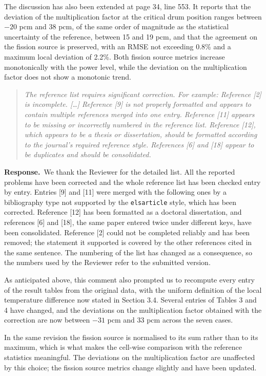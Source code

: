 \documentclass[11pt]{article}
\newenvironment{reviewer}%
  {\medskip\begin{quote}\itshape\color{black!70}}%
  {\end{quote}}
\newcommand{\answer}{\textbf{Response.}\ }
\begin{document}
The discussion has also been extended at page 34, line 553. It reports that the deviation of the multiplication factor at the critical drum position ranges between $-20$ pcm and 38 pcm, of the same order of magnitude as the statistical uncertainty of the reference, between 15 and 19 pcm, and that the agreement on the fission source is preserved, with an RMSE not exceeding 0.8\% and a maximum local deviation of 2.2\%. Both fission source metrics increase monotonically with the power level, while the deviation on the multiplication factor does not show a monotonic trend.
\begin{reviewer}
The reference list requires significant correction. For example: Reference [2] is incomplete. [\ldots] Reference [9] is not properly formatted and appears to contain multiple references merged into one entry. Reference [11] appears to be missing or incorrectly numbered in the reference list. Reference [12], which appears to be a thesis or dissertation, should be formatted according to the journal's required reference style. References [6] and [18] appear to be duplicates and should be consolidated.
\end{reviewer}

\answer We thank the Reviewer for the detailed list. All the reported problems have been corrected and the whole reference list has been checked entry by entry. Entries [9] and [11] were merged with the following ones by a bibliography type not supported by the \texttt{elsarticle} style, which has been corrected. Reference [12] has been formatted as a doctoral dissertation, and references [6] and [18], the same paper entered twice under different keys, have been consolidated. Reference [2] could not be completed reliably and has been removed; the statement it supported is covered by the other references cited in the same sentence. The numbering of the list has changed as a consequence, so the numbers used by the Reviewer refer to the submitted version.

As anticipated above, this comment also prompted us to recompute every entry of the result tables from the original data, with the uniform definition of the local temperature difference now stated in Section 3.4. Several entries of Tables 3 and 4 have changed, and the deviations on the multiplication factor obtained with the correction are now between $-31$ pcm and 33 pcm across the seven cases.

In the same revision the fission source is normalised to its sum rather than to its maximum, which is what makes the cell-wise comparison with the reference statistics meaningful. The deviations on the multiplication factor are unaffected by this choice; the fission source metrics change slightly and have been updated.
\end{document}
